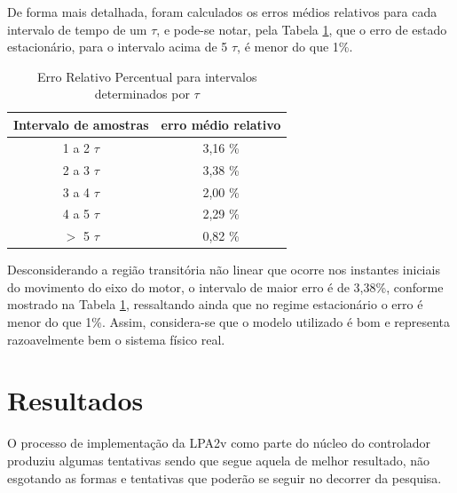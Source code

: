 

De forma mais detalhada, 
foram calculados os erros médios relativos para cada intervalo de 
tempo de um $\tau$, 
e pode-se notar, 
pela Tabela \ref{tab:ErroModeloTau}, 
que o erro de estado estacionário, para o intervalo acima de 5 $\tau$, é menor do que 1\%. 


\begin{table}[h]
\centering
\caption{Erro Relativo Percentual para intervalos determinados por $\tau$ }
\label{tab:ErroModeloTau}

\begin{tabular}{c|c}
\hline
Intervalo de amostras  &  erro médio relativo \\ \hline
\hline
1 a 2 $\tau$ &  3,16 \% \\ \hline
2 a 3 $\tau$ &  3,38 \% \\ \hline
3 a 4 $\tau$ &  2,00 \% \\ \hline
4 a 5 $\tau$ &  2,29 \% \\ \hline
$>$ 5 $\tau$ &  0,82 \% \\ \hline
\end{tabular}
\end{table}


Desconsiderando a região transitória não linear 
que ocorre nos instantes iniciais do movimento do eixo do motor, 
o intervalo de maior erro é de 3,38\%, 
conforme mostrado na Tabela \ref{tab:ErroModeloTau},
ressaltando ainda que no regime estacionário 
o erro é menor do que 1\%.
Assim, considera-se que o modelo utilizado é bom e representa razoavelmente bem o sistema físico real.





\section{Resultados}

O processo de implementação da LPA2v como parte do núcleo do controlador 
produziu algumas tentativas sendo que segue aquela de melhor resultado, 
não esgotando as formas e tentativas que poderão se seguir 
no decorrer da pesquisa.


